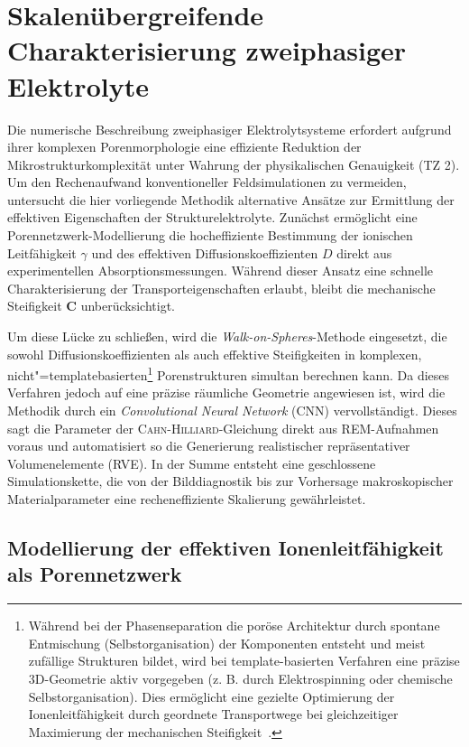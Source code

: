 \chapter{Skalenübergreifende Charakterisierung zweiphasiger Elektrolyte}\label{sec:sim_sbe}

Die numerische Beschreibung zweiphasiger Elektrolytsysteme erfordert aufgrund ihrer komplexen Porenmorphologie eine effiziente Reduktion der Mikrostrukturkomplexität unter Wahrung der physikalischen Genauigkeit (TZ 2). Um den Rechenaufwand konventioneller Feldsimulationen zu vermeiden, untersucht die hier vorliegende Methodik alternative Ansätze zur Ermittlung der effektiven Eigenschaften der Strukturelektrolyte. Zunächst ermöglicht eine Porennetzwerk-Modellierung die hocheffiziente Bestimmung der ionischen Leitfähigkeit $\gamma$ und des effektiven Diffusionskoeffizienten $D$ direkt aus experimentellen Absorptionsmessungen. Während dieser Ansatz eine schnelle Charakterisierung der Transporteigenschaften erlaubt, bleibt die mechanische Steifigkeit $\boldsymbol{C}$ unberücksichtigt. 

Um diese Lücke zu schließen, wird die \textit{Walk-on-Spheres}-Methode eingesetzt, die sowohl Diffusionskoeffizienten als auch effektive Steifigkeiten in komplexen, nicht"=templatebasierten\footnote{Während bei der Phasenseparation die poröse Architektur durch spontane Entmischung (Selbstorganisation) der Komponenten entsteht und meist zufällige Strukturen bildet, wird bei template-basierten Verfahren eine präzise 3D-Geometrie aktiv vorgegeben (z. B. durch Elektrospinning oder chemische Selbstorganisation). Dies ermöglicht eine gezielte Optimierung der Ionenleitfähigkeit durch geordnete Transportwege bei gleichzeitiger Maximierung der mechanischen Steifigkeit~\cite{Menner2006a, Shirshova2013a, Stubenrauch2018}.} Porenstrukturen simultan berechnen kann. Da dieses Verfahren jedoch auf eine präzise räumliche Geometrie angewiesen ist, wird die Methodik durch ein \textit{Convolutional Neural Network} (CNN) vervollständigt. Dieses sagt die Parameter der \textsc{Cahn-Hilliard}-Gleichung direkt aus REM-Aufnahmen voraus und automatisiert so die Generierung realistischer repräsentativer Volumenelemente (RVE). In der Summe entsteht eine geschlossene Simulationskette, die von der Bilddiagnostik bis zur Vorhersage makroskopischer Materialparameter eine recheneffiziente Skalierung gewährleistet.


\section{Modellierung der effektiven Ionenleitfähigkeit als Porennetzwerk}

